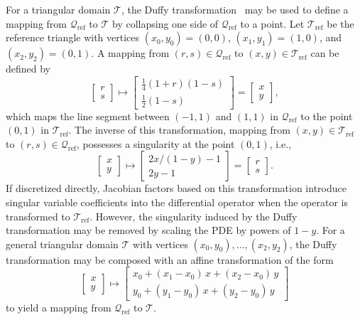 For a triangular domain $\mathcal{T}$, the Duffy transformation~\cite{Duffy_82_01,Sherwin_05_01} may be used to define a mapping from $\mathcal{Q}_\text{ref}$ to $\mathcal{T}$ by collapsing one side of $\mathcal{Q}_\text{ref}$ to a point. Let $\mathcal{T}_\text{ref}$ be the reference triangle with vertices $(x_0,y_0) = (0,0)$, $(x_1,y_1) = (1,0)$, and $(x_2,y_2) = (0,1)$. A mapping from $(r,s) \in \mathcal{Q}_\text{ref}$ to $(x,y) \in \mathcal{T}_\text{ref}$ can be defined by
\[
\begin{bmatrix} r \\ s \end{bmatrix}
\mapsto
\begin{bmatrix} \tfrac14(1+r)(1-s) \\[0.2em] \tfrac12(1-s) \end{bmatrix}
=
\begin{bmatrix} x \\ y \end{bmatrix},
\]
which maps the line segment between $(-1,1)$ and $(1,1)$ in $\mathcal{Q}_\text{ref}$ to the point $(0,1)$ in $\mathcal{T}_\text{ref}$. The inverse of this transformation, mapping from $(x,y) \in \mathcal{T}_\text{ref}$ to $(r,s) \in \mathcal{Q}_\text{ref}$, possesses a singularity at the point $(0,1)$, i.e.,
\[
\begin{bmatrix} x \\ y \end{bmatrix}
\mapsto
\begin{bmatrix} 2x/(1-y)-1 \\[0.2em] 2y-1 \end{bmatrix}
=
\begin{bmatrix} r \\ s \end{bmatrix}.
\]
If discretized directly, Jacobian factors based on this transformation introduce singular variable coefficients into the differential operator when the operator is transformed to $\mathcal{T}_\text{ref}$. However, the singularity induced by the Duffy transformation may be removed by scaling the PDE by powers of $1-y$. For a general triangular domain $\mathcal{T}$ with vertices $(x_0,y_0), \ldots, (x_2,y_2)$, the Duffy transformation may be composed with an affine transformation of the form
\[
\begin{bmatrix} x \\ y \end{bmatrix}
\mapsto
\begin{bmatrix}
x_0 + (x_1-x_0)\,x + (x_2-x_0)\,y \\[0.2em]
y_0 + (y_1-y_0)\,x + (y_2-y_0)\,y \end{bmatrix}
\]
to yield a mapping from $\mathcal{Q}_\text{ref}$ to $\mathcal{T}$.

